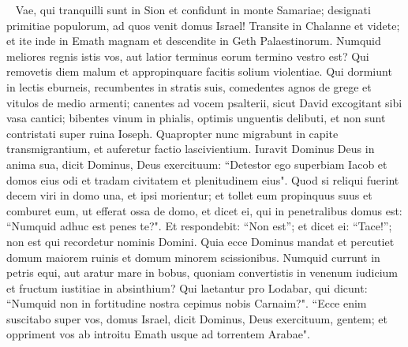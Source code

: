 \begin{biblechapter}   
\verse Vae, qui tranquilli sunt in Sion et confidunt in monte Samariae; designati primitiae populorum, ad quos venit domus Israel! 
\verse Transite in Chalanne et videte; et ite inde in Emath magnam et descendite in Geth Palaestinorum. Numquid meliores regnis istis vos, aut latior terminus eorum termino vestro est? 
\verse Qui removetis diem malum et appropinquare facitis solium violentiae. 
\verse Qui dormiunt in lectis eburneis, recumbentes in stratis suis, comedentes agnos de grege et vitulos de medio armenti; 
\verse canentes ad vocem psalterii, sicut David excogitant sibi vasa cantici; 
\verse bibentes vinum in phialis, optimis unguentis delibuti, et non sunt contristati super ruina Ioseph. 
\verse Quapropter nunc migrabunt in capite transmigrantium, et auferetur factio lascivientium. 
\verse Iuravit Dominus Deus in anima sua, dicit Dominus, Deus exercituum: “Detestor ego superbiam Iacob et domos eius odi et tradam civitatem et plenitudinem eius". 
\verse Quod si reliqui fuerint decem viri in domo una, et ipsi morientur; 
\verse et tollet eum propinquus suus et comburet eum, ut efferat ossa de domo, et dicet ei, qui in penetralibus domus est: “Numquid adhuc est penes te?". Et respondebit: “Non est”; et dicet ei: “Tace!”; non est qui recordetur nominis Domini. 
\verse Quia ecce Dominus mandat et percutiet domum maiorem ruinis et domum minorem scissionibus. 
\verse Numquid currunt in petris equi, aut aratur mare in bobus, quoniam convertistis in venenum iudicium et fructum iustitiae in absinthium? 
\verse Qui laetantur pro Lodabar, qui dicunt: “Numquid non in fortitudine nostra cepimus nobis Carnaim?". 
\verse “Ecce enim suscitabo super vos, domus Israel, dicit Dominus, Deus exercituum, gentem; et oppriment vos ab introitu Emath usque ad torrentem Arabae". 
\end{biblechapter}

